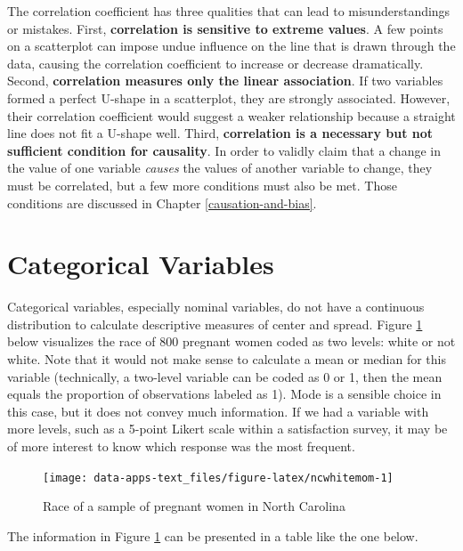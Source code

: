 \documentclass[
]{book}
\begin{document}
The correlation coefficient has three qualities that can lead to misunderstandings or mistakes. First, \textbf{correlation is sensitive to extreme values}. A few points on a scatterplot can impose undue influence on the line that is drawn through the data, causing the correlation coefficient to increase or decrease dramatically. Second, \textbf{correlation measures only the linear association}. If two variables formed a perfect U-shape in a scatterplot, they are strongly associated. However, their correlation coefficient would suggest a weaker relationship because a straight line does not fit a U-shape well. Third, \textbf{correlation is a necessary but not sufficient condition for causality}. In order to validly claim that a change in the value of one variable \emph{causes} the values of another variable to change, they must be correlated, but a few more conditions must also be met. Those conditions are discussed in Chapter \ref{causation-and-bias}.

\hypertarget{categorical-variables}{%
\section{Categorical Variables}\label{categorical-variables}}

Categorical variables, especially nominal variables, do not have a continuous distribution to calculate descriptive measures of center and spread. Figure \ref{fig:ncwhitemom} below visualizes the race of 800 pregnant women coded as two levels: white or not white. Note that it would not make sense to calculate a mean or median for this variable (technically, a two-level variable can be coded as 0 or 1, then the mean equals the proportion of observations labeled as 1). Mode is a sensible choice in this case, but it does not convey much information. If we had a variable with more levels, such as a 5-point Likert scale within a satisfaction survey, it may be of more interest to know which response was the most frequent.

\begin{figure}

{\centering \texttt{[image: data-apps-text\_files/figure-latex/ncwhitemom-1]} 

}

\caption{Race of a sample of pregnant women in North Carolina}\label{fig:ncwhitemom}
\end{figure}

The information in Figure \ref{fig:ncwhitemom} can be presented in a table like the one below.
\end{document}
